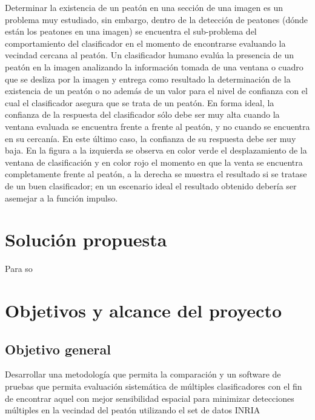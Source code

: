 Determinar la existencia de un peat\'on en una secci\'on de una imagen es un problema muy estudiado, sin embargo, dentro de la detección de peatones (d\'onde est\'an los peatones en una imagen) se encuentra el sub-problema del comportamiento del clasificador en el momento de encontrarse evaluando la vecindad cercana al peat\'on.
Un clasificador humano evalúa la presencia de un peat\'on en la imagen analizando la informaci\'on tomada de una ventana o cuadro que se desliza por la imagen y entrega como resultado la determinaci\'on de la existencia de un peatón o no adem\'as de un valor para el nivel de confianza con el cual el clasificador asegura que se trata de un peat\'on.
En forma ideal, la confianza de la respuesta del clasificador s\'olo debe ser muy alta cuando la ventana evaluada se encuentra frente a frente al peat\'on, y no cuando se encuentra en su cercanía. En este \'ultimo caso, la confianza de su respuesta debe ser muy baja. En la figura  a la izquierda se observa en color verde el desplazamiento de la ventana de clasificación y en color rojo el momento en que la venta se encuentra completamente frente al peatón, a la derecha se muestra el resultado si se tratase de un buen clasificador; en un escenario ideal el resultado obtenido debería ser asemejar a la función impulso.




\section{Soluci\'on propuesta}
\label{intro:solucion}

Para so

\section{Objetivos y alcance del proyecto}
\label{intro:objetivos}

\subsection{Objetivo general}

Desarrollar una metodología que permita la comparación y un software de pruebas que permita evaluación sistemática de múltiples clasificadores con el fin de encontrar aquel con mejor sensibilidad espacial para minimizar detecciones múltiples en la vecindad del peatón utilizando el set de datos INRIA


